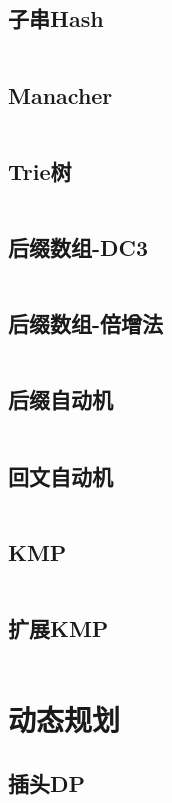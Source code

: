 \documentclass[UTF8]{ctexart}
\begin{document}
\subsection{子串Hash}
\inputminted{cpp}{string/Hash.cpp}

\subsection{Manacher}
\inputminted{cpp}{string/Manacher回文串.cpp}

\subsection{Trie树}
\inputminted{cpp}{string/Trie树.cpp}

\subsection{后缀数组-DC3}
\inputminted{cpp}{string/后缀数组-DC3.cpp}

\subsection{后缀数组-倍增法}
\inputminted{cpp}{string/后缀数组-倍增法.cpp}

\subsection{后缀自动机}
\inputminted{cpp}{string/后缀自动机.cpp}

\subsection{回文自动机}
\inputminted{cpp}{string/回文自动机.cpp}

\subsection{KMP}
\inputminted{cpp}{string/KMP.cpp}

\subsection{扩展KMP}
\inputminted{cpp}{string/扩展KMP.cpp}

\section{动态规划}

\subsection{插头DP}
\inputminted{cpp}{dp/插头dp.cpp}
\end{document}
